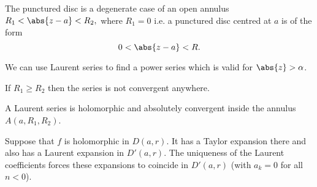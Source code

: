 \documentclass[12pt, a4paper]{article}
\begin{document}
\begin{mdremark}
    The punctured disc is a degenerate case of an open annulus \(R_1 < \abs{z-a} < R_2,\) where \(R_1 =0\) i.e. a punctured disc centred at \(a\) is of the form 
    \[0<\abs{z-a}<R.\]
\end{mdremark}

\begin{mdnote}
    We can use Laurent series to find a power series which is valid for \(\abs{z} > \alpha\).
\end{mdnote}

\begin{theorem}
    If \(R_1 \geq R_2\) then the series is not convergent anywhere.
\end{theorem}

\begin{mdthm}
    A Laurent series is holomorphic and absolutely convergent inside the annulus \\ \(A(a,R_1,R_2)\).
\end{mdthm}

\begin{mdnote}
    Suppose that \(f\) is holomorphic in \(D(a, r)\). It has a Taylor expansion there and also has a Laurent expansion in \(D'(a,r)\). The uniqueness of the Laurent coefficients forces these expansions to coincide in \(D'(a,r)\) (with \(a_k =0 \) for all \(n<0\)).
\end{mdnote}
\end{document}
